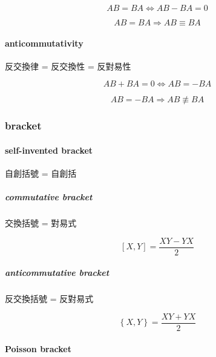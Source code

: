 \documentclass[
]{book}
\theoremstyle{definition}
\theoremstyle{definition}
\theoremstyle{definition}
\theoremstyle{definition}
\theoremstyle{remark}
\begin{document}
\[
AB=BA\Leftrightarrow AB-BA=0
\]

\[
AB=BA\Rightarrow AB\equiv BA
\]

\hypertarget{anticommutativity}{%
\paragraph{anticommutativity}\label{anticommutativity}}

\begin{CJK}{UTF8}{bsmi}
反交換律 = 反交換性 = 反對易性
\end{CJK}

\[
AB+BA=0\Leftrightarrow AB=-BA
\]

\[
AB=-BA\Rightarrow AB\not\equiv BA
\]

\hypertarget{bracket}{%
\subsubsection{bracket}\label{bracket}}

\hypertarget{self-invented-bracket}{%
\paragraph{self-invented bracket}\label{self-invented-bracket}}

\begin{CJK}{UTF8}{bsmi}
自創括號 = 自創括
\end{CJK}

\hypertarget{commutative-bracket}{%
\subparagraph{commutative bracket}\label{commutative-bracket}}

\begin{CJK}{UTF8}{bsmi}
交換括號 = 對易式
\end{CJK}

\[
\left[X,Y\right]=\dfrac{XY-YX}{2}
\]

\hypertarget{anticommutative-bracket}{%
\subparagraph{anticommutative bracket}\label{anticommutative-bracket}}

\begin{CJK}{UTF8}{bsmi}
反交換括號 = 反對易式
\end{CJK}

\[
\left\{ X,Y\right\} =\dfrac{XY+YX}{2}
\]

\hypertarget{poisson-bracket}{%
\paragraph{Poisson bracket}\label{poisson-bracket}}
\end{document}
